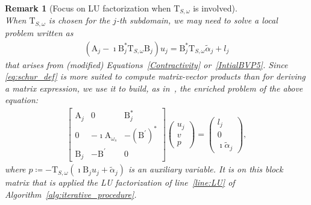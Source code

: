 \documentclass[a4paper,11pt]{article}
\newcommand{\mA}{\mathrm{A}}
\newcommand{\mB}{\mathrm{B}}
\newcommand{\mT}{\mathrm{T}}
\newtheorem{rem}[defn]{Remark}
\begin{document}
\begin{rem}[Focus on LU factorization when \(\mT_{S,\omega}\) is involved]\label{rq:lu_schur}\quad\\
  When \(\mT_{S,\omega}\) is chosen for the \(j\)-th subdomain, we may need to solve a local problem written as
  \begin{align*}
    (\mA_{j} -\imath\mB_{j}^* \mT_{S,\omega} \mB_{j})u_{j} = \mB_{j}^{*} \mT_{S,\omega} \tilde{\alpha}_j + l_{j}
  \end{align*}
  that arises from (modified) Equations~\eqref{Contractivity}
  or~\eqref{IntialBVP5}. Since \cref{eq:schur_def} is more suited to
  compute matrix-vector products than for deriving a matrix expression, we
  use it to build, as in~\cite[§4.2]{ClaeysCollinoEtAl2022NOS}, the
  enriched problem of the above equation:
  \begin{align*}
    \begin{bmatrix}
      \mA_{j} & 0 & \mB_{j}^* \\
      0 & -\imath \mA_{\omega_s} & - (\mB^{'})^* \\
      \mB_{j} & - \mB^{'} & 0
    \end{bmatrix}
    \begin{pmatrix}
      u_{j} \\
      v \\
      p
    \end{pmatrix}
    =
    \begin{pmatrix}
      l_{j} \\
      0 \\
      \imath \tilde{\alpha}_j
    \end{pmatrix},
  \end{align*}
  where \(p \coloneqq - \mT_{S,\omega} (\imath \mB_{j} u_{j} + \tilde{\alpha}_j)\) is an auxiliary variable.
  It is on this block matrix that is applied the LU factorization of line~\ref{line:LU} of Algorithm~\ref{alg:iterative_procedure}.
\end{rem}
\end{document}
